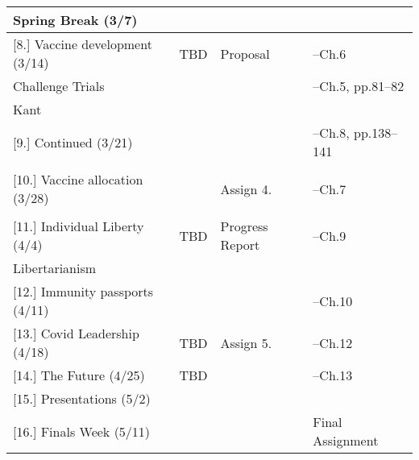 \documentclass[article,oneside]{memoir}
\begin{document}
\begin{landscape}
\begin{center}
\begin{longtable}{p{6cm}p{4cm}p{6cm}p{4cm}}
\textbf{Spring Break} (3/7) & & & \\ [1.8\baselineskip]  \hline

 							

[8.] Vaccine development (3/14)	& TBD		& Proposal				& --Ch.6 \\ 
Challenge Trials				& 	 		&						& --Ch.5, pp.81--82  \\ 
Kant							&			&						&    	\\ [1.8\baselineskip] \hline		

[9.] Continued	(3/21)			& 			& 						&  --Ch.8, pp.138--141\\ 
							&			&						&    	\\ [1.8\baselineskip] \hline	 

[10.] Vaccine allocation (3/28)		& 			& Assign 4.				& --Ch.7  \\
	    						&			&      						&  \\  [1.8\baselineskip] \hline


[11.] Individual Liberty (4/4)		&	TBD		& Progress Report			& --Ch.9  \\ 
Libertarianism					 &			&						& 	 \\ [1.8\baselineskip] \hline				


[12.] Immunity passports  (4/11) 	& 			&  			    			 & --Ch.10 \\ [1.8\baselineskip] \hline

[13.] Covid Leadership  (4/18) 		& TBD		&  Assign 5.    		  		 & --Ch.12   \\ [1.8\baselineskip] \hline


[14.] The Future  (4/25) 			& TBD		& 		     				 & --Ch.13   \\ [1.8\baselineskip] \hline


[15.] Presentations	(5/2)			& 			&						&  \\ [1.8\baselineskip] \hline

[16.] Finals Week (5/11)			&			&						 & Final Assignment \\ [1.8\baselineskip] \hline
	

\end{longtable}
\end{center}
\end{landscape}
\end{document}
